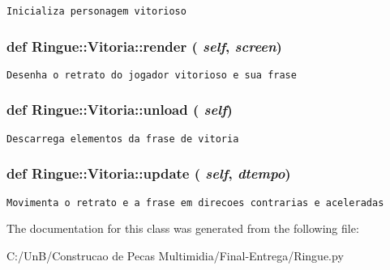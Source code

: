 \begin{footnotesize}\begin{verbatim}Inicializa personagem vitorioso \end{verbatim}
\end{footnotesize}
 \hypertarget{class_ringue_1_1_vitoria_27823de6222df64854273e30db874e81}{
\subsubsection[{render}]{\setlength{\rightskip}{0pt plus 5cm}def Ringue::Vitoria::render ( {\em self}, \/   {\em screen})}}
\label{class_ringue_1_1_vitoria_27823de6222df64854273e30db874e81}




\begin{footnotesize}\begin{verbatim}Desenha o retrato do jogador vitorioso e sua frase \end{verbatim}
\end{footnotesize}
 \hypertarget{class_ringue_1_1_vitoria_ac1d90801a9d567cc801e5710f22ebf5}{
\subsubsection[{unload}]{\setlength{\rightskip}{0pt plus 5cm}def Ringue::Vitoria::unload ( {\em self})}}
\label{class_ringue_1_1_vitoria_ac1d90801a9d567cc801e5710f22ebf5}




\begin{footnotesize}\begin{verbatim}Descarrega elementos da frase de vitoria \end{verbatim}
\end{footnotesize}
 \hypertarget{class_ringue_1_1_vitoria_4fff1903c138ae1b6abba2631f183421}{
\subsubsection[{update}]{\setlength{\rightskip}{0pt plus 5cm}def Ringue::Vitoria::update ( {\em self}, \/   {\em dtempo})}}
\label{class_ringue_1_1_vitoria_4fff1903c138ae1b6abba2631f183421}




\begin{footnotesize}\begin{verbatim}Movimenta o retrato e a frase em direcoes contrarias e aceleradas \end{verbatim}
\end{footnotesize}
 

The documentation for this class was generated from the following file:\begin{CompactItemize}
\item 
C:/UnB/Construcao de Pecas Multimidia/Final-Entrega/Ringue.py\end{CompactItemize}
